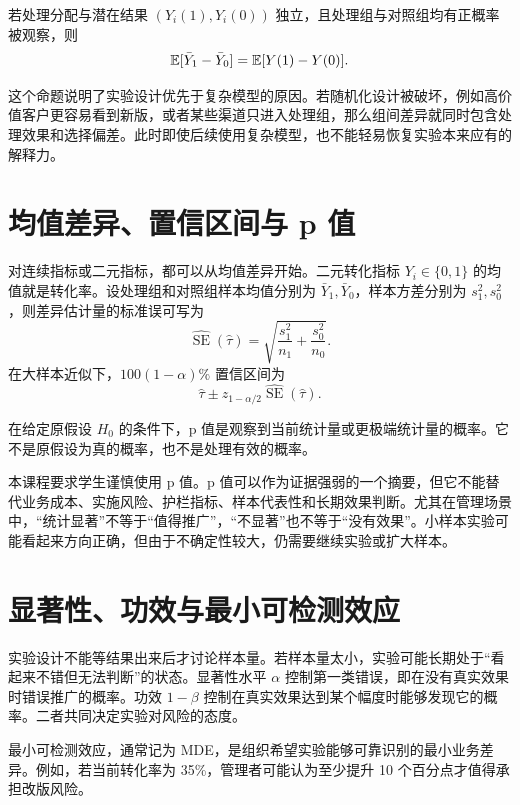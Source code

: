 \documentclass[UTF8,fontset=fandol,openany,zihao=-4]{ctexbook}
\begin{document}
\begin{proposition}[随机化差异估计量的无偏性]
若处理分配与潜在结果 \((Y_i(1),Y_i(0))\) 独立，且处理组与对照组均有正概率被观察，则
\[
  \mathbb E[\bar Y_1-\bar Y_0]=\mathbb E[Y(1)-Y(0)].
\]
\end{proposition}

这个命题说明了实验设计优先于复杂模型的原因。若随机化设计被破坏，例如高价值客户更容易看到新版，或者某些渠道只进入处理组，那么组间差异就同时包含处理效果和选择偏差。此时即使后续使用复杂模型，也不能轻易恢复实验本来应有的解释力。

\section{均值差异、置信区间与 p 值}

对连续指标或二元指标，都可以从均值差异开始。二元转化指标 \(Y_i\in\{0,1\}\) 的均值就是转化率。设处理组和对照组样本均值分别为 \(\bar Y_1,\bar Y_0\)，样本方差分别为 \(s_1^2,s_0^2\)，则差异估计量的标准误可写为
\[
  \widehat{\operatorname{SE}}(\hat\tau)
  =
  \sqrt{\frac{s_1^2}{n_1}+\frac{s_0^2}{n_0}}.
\]
在大样本近似下，\(100(1-\alpha)\%\) 置信区间为
\[
  \hat\tau
  \pm
  z_{1-\alpha/2}\widehat{\operatorname{SE}}(\hat\tau).
\]

\begin{definition}[p 值]
在给定原假设 \(H_0\) 的条件下，p 值是观察到当前统计量或更极端统计量的概率。它不是原假设为真的概率，也不是处理有效的概率。
\end{definition}

本课程要求学生谨慎使用 p 值。p 值可以作为证据强弱的一个摘要，但它不能替代业务成本、实施风险、护栏指标、样本代表性和长期效果判断。尤其在管理场景中，“统计显著”不等于“值得推广”，“不显著”也不等于“没有效果”。小样本实验可能看起来方向正确，但由于不确定性较大，仍需要继续实验或扩大样本。

\section{显著性、功效与最小可检测效应}

实验设计不能等结果出来后才讨论样本量。若样本量太小，实验可能长期处于“看起来不错但无法判断”的状态。显著性水平 \(\alpha\) 控制第一类错误，即在没有真实效果时错误推广的概率。功效 \(1-\beta\) 控制在真实效果达到某个幅度时能够发现它的概率。二者共同决定实验对风险的态度。

最小可检测效应，通常记为 MDE，是组织希望实验能够可靠识别的最小业务差异。例如，若当前转化率为 35\%，管理者可能认为至少提升 10 个百分点才值得承担改版风险。
\end{document}
